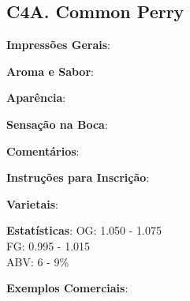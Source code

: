 \subsection*{C4A. Common Perry}

\textbf{Impressões Gerais}:

\textbf{Aroma e Sabor}:

\textbf{Aparência}:

\textbf{Sensação na Boca}:

\textbf{Comentários}:

\textbf{Instruções para Inscrição}:

\textbf{Varietais}:

\textbf{Estatísticas}: OG: 1.050 - 1.075 \\
\phantom{ } \hspace{16.5mm} FG: 0.995 - 1.015 \\
\phantom{ } \hspace{16.5mm} ABV: 6 - 9\%

\textbf{Exemplos Comerciais}: